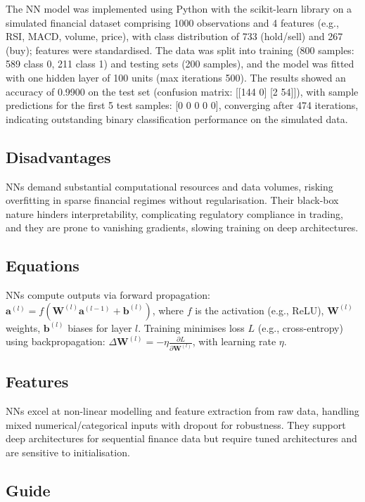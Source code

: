 \documentclass{article}
\begin{document}
The NN model was implemented using Python with the scikit-learn library on a simulated financial dataset comprising 1000 observations and 4 features (e.g., RSI, MACD, volume, price), with class distribution of 733 (hold/sell) and 267 (buy); features were standardised. The data was split into training (800 samples: 589 class 0, 211 class 1) and testing sets (200 samples), and the model was fitted with one hidden layer of 100 units (max iterations 500). The results showed an accuracy of 0.9900 on the test set (confusion matrix: [[144 0] [2 54]]), with sample predictions for the first 5 test samples: [0 0 0 0 0], converging after 474 iterations, indicating outstanding binary classification performance on the simulated data.

\subsection{Disadvantages}

NNs demand substantial computational resources and data volumes, risking overfitting in sparse financial regimes without regularisation. Their black-box nature hinders interpretability, complicating regulatory compliance in trading, and they are prone to vanishing gradients, slowing training on deep architectures.

\subsection{Equations}

NNs compute outputs via forward propagation: $\mathbf{a}^{(l)} = f(\mathbf{W}^{(l)} \mathbf{a}^{(l-1)} + \mathbf{b}^{(l)})$, where $f$ is the activation (e.g., ReLU), $\mathbf{W}^{(l)}$ weights, $\mathbf{b}^{(l)}$ biases for layer $l$. Training minimises loss $L$ (e.g., cross-entropy) using backpropagation: $\Delta \mathbf{W}^{(l)} = -\eta \frac{\partial L}{\partial \mathbf{W}^{(l)}}$, with learning rate $\eta$.

\subsection{Features}

NNs excel at non-linear modelling and feature extraction from raw data, handling mixed numerical/categorical inputs with dropout for robustness. They support deep architectures for sequential finance data but require tuned architectures and are sensitive to initialisation.

\subsection{Guide}
\end{document}
